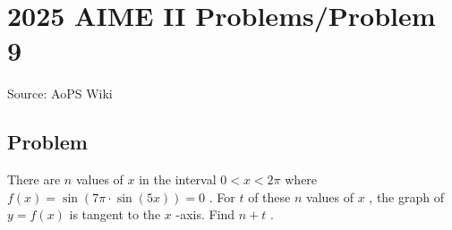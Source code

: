 \documentclass[12pt]{article}
\begin{document}
\section*{{2025 AIME II Problems/Problem 9}}
Source: AoPS Wiki

\subsection*{Problem}
There are $n$ values of $x$ in the interval $0<x<2\pi$ where $f(x)=\sin(7\pi\cdot\sin(5x))=0$ . For $t$ of these $n$ values of $x$ , the graph of $y=f(x)$ is tangent to the $x$ -axis. Find $n+t$ .
\end{document}
